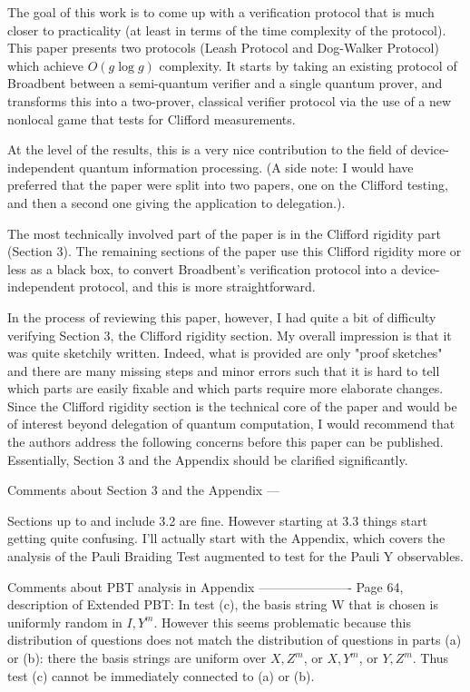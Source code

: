 \documentclass[12pt]{article}
\begin{document}
The goal of this work is to come up with a verification protocol that is much closer to practicality (at least in terms of the time complexity of the protocol). This paper presents two protocols (Leash Protocol and Dog-Walker Protocol) which achieve $O(g \log g)$ complexity. It starts by taking an existing protocol of Broadbent between a semi-quantum verifier and a single quantum prover, and transforms this into a two-prover, classical verifier protocol via the use of a new nonlocal game that tests for Clifford measurements.

At the level of the results, this is a very nice contribution to the field of device-independent quantum information processing. (A side note: I would have preferred that the paper were split into two papers, one on the Clifford testing, and then a second one giving the application to delegation.).

The most technically involved part of the paper is in the Clifford rigidity part (Section 3). The remaining sections of the paper use this Clifford rigidity more or less as a black box, to convert Broadbent's verification protocol into a device-independent protocol, and this is more straightforward.

In the process of reviewing this paper, however, I had quite a bit of difficulty verifying Section 3, the Clifford rigidity section. My overall impression is that it was quite sketchily written. Indeed, what is provided are only "proof sketches" and there are many missing steps and minor errors such that it is hard to tell which parts are easily fixable and which parts require more elaborate changes. Since the Clifford rigidity section is the technical core of the paper and would be of interest beyond delegation of quantum computation, I would recommend that the authors address the following concerns before this paper can be published. Essentially, Section 3 and the Appendix should be clarified significantly.

Comments about Section 3 and the Appendix
---

Sections up to and include 3.2 are fine. However starting at 3.3 things start getting quite confusing. I'll actually start with the Appendix, which covers the analysis of the Pauli Braiding Test augmented to test for the Pauli Y observables.

Comments about PBT analysis in Appendix
----------------------
Page 64, description of Extended PBT: In test (c), the basis string W that is chosen is uniformly random in ${I, Y}^m$. However this seems problematic because this distribution of questions does not match the distribution of questions in parts (a) or (b): there the basis strings are uniform over ${X,Z}^m$, or ${X,Y}^m$, or ${Y,Z}^m$. Thus test (c) cannot be immediately connected to (a) or (b).
\end{document}
